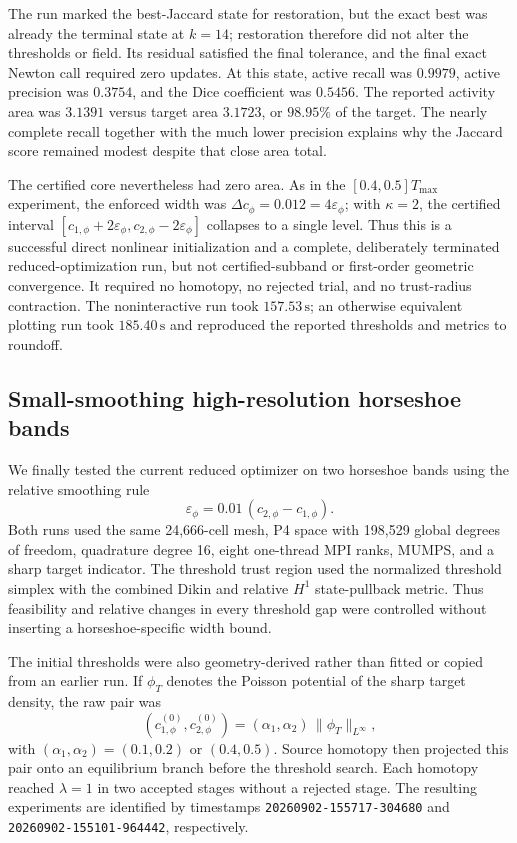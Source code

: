 The run marked the best-Jaccard state for restoration, but the exact best was
already the terminal state at $k=14$; restoration therefore did not alter the
thresholds or field. Its residual satisfied the final tolerance, and the
final exact Newton call required zero updates. At this state, active recall
was $0.9979$, active precision was $0.3754$, and the Dice coefficient was
$0.5456$. The reported activity area was $3.1391$ versus target area $3.1723$,
or $98.95\%$ of the target. The nearly complete recall together with the much
lower precision explains why the Jaccard score remained modest despite that
close area total.

The certified core nevertheless had zero area. As in the
$[0.4,0.5]T_{\max}$ experiment, the enforced width was
$\Delta c_\phi=0.012=4\varepsilon_\phi$; with $\kappa=2$, the certified
interval
$[c_{1,\phi}+2\varepsilon_\phi,c_{2,\phi}-2\varepsilon_\phi]$ collapses to a
single level. Thus this is a successful direct nonlinear initialization and
a complete, deliberately terminated reduced-optimization run, but not
certified-subband or first-order geometric convergence. It required no
homotopy, no rejected trial, and no trust-radius contraction. The
noninteractive run took $157.53\,\mathrm{s}$; an otherwise equivalent
plotting run took $185.40\,\mathrm{s}$ and reproduced the reported thresholds
and metrics to roundoff.

\clearpage
\subsection{Small-smoothing high-resolution horseshoe bands}
\label{sec:horseshoe-small-epsilon-highdof}
We finally tested the current reduced optimizer on two horseshoe bands using
the relative smoothing rule
\[
  \varepsilon_\phi=0.01\,(c_{2,\phi}-c_{1,\phi}).
\]
Both runs used the same 24,666-cell mesh, P4 space with 198,529 global degrees
of freedom, quadrature degree 16, eight one-thread MPI ranks, MUMPS, and a
sharp target indicator.  The threshold trust region used the normalized
threshold simplex with the combined Dikin and relative $H^1$ state-pullback
metric.  Thus feasibility and relative changes in every threshold gap were
controlled without inserting a horseshoe-specific width bound.

The initial thresholds were also geometry-derived rather than fitted or
copied from an earlier run.  If $\phi_T$ denotes the Poisson potential of the
sharp target density, the raw pair was
\[
  (c_{1,\phi}^{(0)},c_{2,\phi}^{(0)})
  =(\alpha_1,\alpha_2)\,\|\phi_T\|_{L^\infty},
\]
with $(\alpha_1,\alpha_2)=(0.1,0.2)$ or $(0.4,0.5)$.  Source homotopy then
projected this pair onto an equilibrium branch before the threshold search.
Each homotopy reached $\lambda=1$ in two accepted stages without a rejected
stage.  The resulting experiments are identified by timestamps
\texttt{20260902-155717-304680} and
\texttt{20260902-155101-964442}, respectively.

